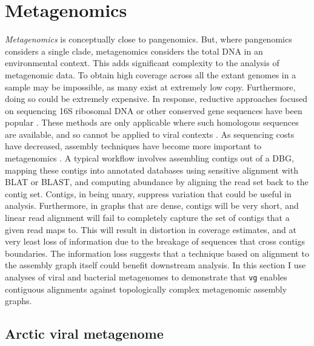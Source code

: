 \documentclass[a4paper,12pt,numbered,oneside]{Classes/PhDThesisPSnPDF}
\begin{document}
\section{Metagenomics}

\emph{Metagenomics} is conceptually close to pangenomics.
But, where pangenomics considers a single clade, metagenomics considers the total DNA in an environmental context.
This adds significant complexity to the analysis of metagenomic data.
To obtain high coverage across all the extant genomes in a sample may be impossible, as many exist at extremely low copy.
Furthermore, doing so could be extremely expensive.
In response, reductive approaches focused on sequencing 16S ribosomal DNA or other conserved gene sequences have been popular \cite{tringe2005comparative}.
These methods are only applicable where such homologous sequences are available, and so cannot be applied to viral contexts \cite{edwards2005viral}.
As sequencing costs have decreased, assembly techniques have become more important to metagenomics \cite{nurk2017metaspades}.
A typical workflow involves assembling contigs out of a DBG, mapping these contigs into annotated databases using sensitive alignment with BLAT or BLAST, and computing abundance by aligning the read set back to the contig set.
Contigs, in being unary, suppress variation that could be useful in analysis.
Furthermore, in graphs that are dense, contigs will be very short, and linear read alignment will fail to completely capture the set of contigs that a given read maps to.
This will result in distortion in coverage estimates, and at very least loss of information due to the breakage of sequences that cross contigs boundaries.
The information loss suggests that a technique based on alignment to the assembly graph itself could benefit downstream analysis.
In this section I use analyses of viral and bacterial metagenomes to demonstrate that {\tt vg} enables contiguous alignments against topologically complex metagenomic assembly graphs.

\subsection{Arctic viral metagenome}
\end{document}
